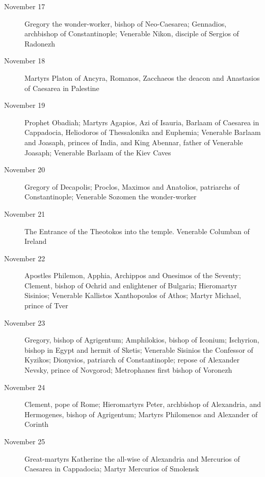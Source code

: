 \begin{description}
\item[November 17]

Gregory the wonder-worker, bishop of Neo-Caesarea; Gennadios, archbishop of Constantinople; Venerable Nikon, disciple of Sergios of Radonezh

\item[November 18]

Martyrs Platon of Ancyra, Romanos, Zacchaeos the deacon and Anastasios of Caesarea in Palestine

\item[November 19]

Prophet Obadiah; Martyrs Agapios, Azi of Isauria, Barlaam of Caesarea in Cappadocia, Heliodoros of Thessalonika and Euphemia; Venerable Barlaam and Joasaph, princes of India, and King Abennar, father of Venerable Joasaph; Venerable Barlaam of the Kiev Caves

\item[November 20]

Gregory of Decapolis; Proclos, Maximos and Anatolios, patriarchs of Constantinople; Venerable Sozomen the wonder-worker

\item[November 21]

The Entrance of the Theotokos into the temple. Venerable Columban of Ireland
\item[November 22]

Apostles Philemon, Apphia, Archippos and Onesimos of the Seventy; Clement, bishop of Ochrid and enlightener of Bulgaria; Hieromartyr Sisinios; Venerable Kallistos Xanthopoulos of Athos; Martyr Michael, prince of Tver

\item[November 23]

Gregory, bishop of Agrigentum; Amphilokios, bishop of Iconium; Ischyrion, bishop in Egypt and hermit of Sketis; Venerable Sisinios the Confessor of Kyzikos; Dionysios, patriarch of Constantinople; repose of Alexander Nevsky, prince of Novgorod; Metrophanes first bishop of Voronezh

\item[November 24]

Clement, pope of Rome; Hieromartyrs Peter, archbishop of Alexandria, and Hermogenes, bishop of Agrigentum; Martyrs Philomenos and Alexander of Corinth

\item[November 25]

Great-martyrs Katherine the all-wise of Alexandria and Mercurios of Caesarea in Cappadocia; Martyr Mercurios of Smolensk


\end{description}
